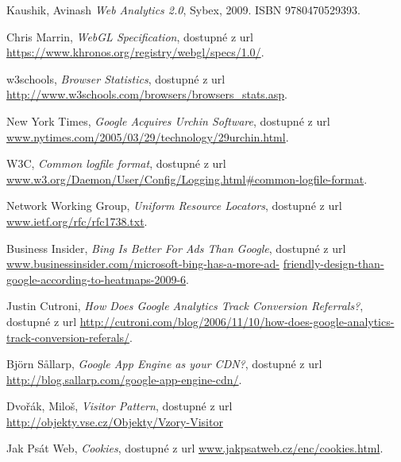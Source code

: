 \documentclass[bc,male,java,dept456]{diploma}						%
\begin{document}
\begin{thebibliography}{99}


 Kaushik, Avinash
\textit{Web Analytics 2.0}, Sybex, 2009. ISBN 9780470529393.


 Chris Marrin,
\textit{WebGL Specification}, dostupné z url \url{https://www.khronos.org/registry/webgl/specs/1.0/}.

 w3schools,
\textit{Browser Statistics}, dostupné z url \url{http://www.w3schools.com/browsers/browsers_stats.asp}.


 New York Times,
\textit{Google Acquires Urchin Software}, dostupné z url \url{www.nytimes.com/2005/03/29/technology/29urchin.html}.

 W3C,
\textit{Common logfile format}, dostupné z url \url{www.w3.org/Daemon/User/Config/Logging.html#common-logfile-format}.


 Network Working Group,
\textit{Uniform Resource Locators}, dostupné z url \url{www.ietf.org/rfc/rfc1738.txt}.

 Business Insider,
\textit{Bing Is Better For Ads Than Google}, dostupné z url \url{www.businessinsider.com/microsoft-bing-has-a-more-ad-} \url{friendly-design-than-google-according-to-heatmaps-2009-6}.


 Justin Cutroni,
\textit{How Does Google Analytics Track Conversion Referrals?}, dostupné z url \url{http://cutroni.com/blog/2006/11/10/how-does-google-analytics-track-conversion-referals/}.





 Björn Sållarp,
\textit{Google App Engine as your CDN?}, dostupné z url \url{http://blog.sallarp.com/google-app-engine-cdn/}.


 Dvořák, Miloš,
\textit{Visitor Pattern}, dostupné z url \url{http://objekty.vse.cz/Objekty/Vzory-Visitor}


 Jak Psát Web,
\textit{Cookies}, dostupné z url \url{www.jakpsatweb.cz/enc/cookies.html}.


\end{thebibliography}
\end{document}
